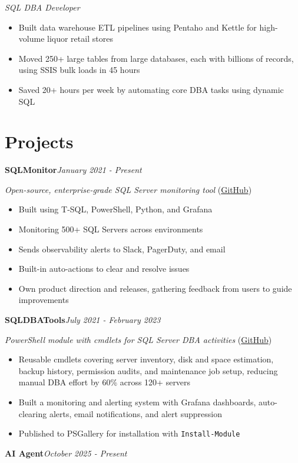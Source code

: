 \documentclass[10pt,a4paper]{article}
\begin{document}
\textit{SQL DBA Developer}\\[-5pt]
\begin{itemize}
  \item Built data warehouse ETL pipelines using Pentaho and Kettle for high-volume liquor retail stores
  \item Moved 250+ large tables from large databases, each with billions of records, using SSIS bulk loads in 45 hours
  \item Saved 20+ hours per week by automating core DBA tasks using dynamic SQL
\end{itemize}

\section{Projects}

\noindent\textbf{SQLMonitor}\hfill \textit{January 2021 - Present}

\textit{Open-source, enterprise-grade SQL Server monitoring tool} (\href{https://github.com/imajaydwivedi/SQLMonitor}{GitHub})
\begin{itemize}
  \item Built using T-SQL, PowerShell, Python, and Grafana
  \item Monitoring 500+ SQL Servers across environments
  \item Sends observability alerts to Slack, PagerDuty, and email
  \item Built-in auto-actions to clear and resolve issues
  \item Own product direction and releases, gathering feedback from users to guide improvements
\end{itemize}
\vspace{14.7pt}
\noindent\textbf{SQLDBATools}\hfill \textit{July 2021 - February 2023}

\textit{PowerShell module with cmdlets for SQL Server DBA activities} (\href{https://github.com/imajaydwivedi/SQLDBATools}{GitHub})
\begin{itemize}
  \item Reusable cmdlets covering server inventory, disk and space estimation, backup history, permission audits, and maintenance job setup, reducing manual DBA effort by 60\% across 120+ servers
  \item Built a monitoring and alerting system with Grafana dashboards, auto-clearing alerts, email notifications, and alert suppression
  \item Published to PSGallery for installation with \texttt{Install-Module}
\end{itemize}
\vspace{14.7pt}
\noindent\textbf{AI Agent}\hfill \textit{October 2025 - Present}
\end{document}
